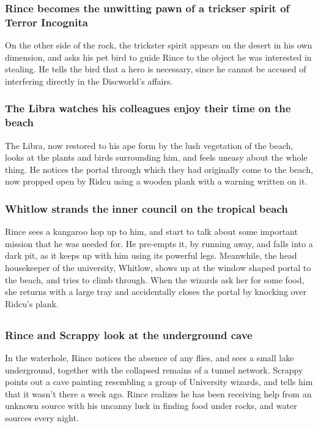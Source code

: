 \subsubsection{\Gls{Rince} becomes the unwitting pawn of a trickser spirit of Terror Incognita}
On the other side of the rock, the trickster spirit appears on the desert in his own dimension,
and asks his pet bird to guide \Gls{Rince} to the object he was interested in stealing. He tells
the bird that a hero is necessary, since he cannot be accused of interfering directly in the
Discworld's affairs.

\subsubsection{The \Gls{Libra} watches his colleagues enjoy their time on the beach}
The \Gls{Libra}, now restored to his ape form by the lush vegetation of the beach, looks at the
plants and birds surrounding him, and feels uneasy about the whole thing. He notices the portal
through which they had originally come to the beach, now propped open by \Gls{Ridcu} using a wooden
plank with a warning written on it.

\subsubsection{\Gls{Whitlow} strands the inner council on the tropical beach}
\Gls{Rince} sees a kangaroo hop up to him, and start to talk about some important mission that he
was needed for. He pre-empts it, by running away, and falls into a dark pit, as it keeps up with him
using its powerful legs. Meanwhile, the head housekeeper of the university, \Gls{Whitlow}, shows up
at the window shaped portal to the beach, and tries to climb through. When the wizards ask her for
some food, she returns with a large tray and accidentally closes the portal by knocking over
\Gls{Ridcu}'s plank.

\subsection{}
\subsubsection{\Gls{Rince} and \Gls{Scrappy} look at the underground cave}
In the waterhole, \Gls{Rince} notices the absence of any flies, and sees a small lake underground,
together with the collapsed remains of a tunnel network. \Gls{Scrappy} points out a cave painting
resembling a group of University wizards, and tells him that it wasn't there a week ago. \Gls{Rince}
realizes he has been receiving help from an unknown source with his uncanny luck in finding food
under rocks, and water sources every night.

